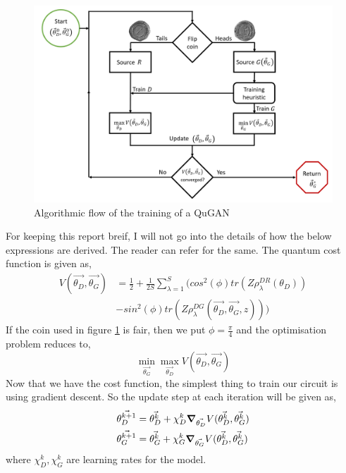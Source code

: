 \documentclass[conference]{IEEEtran}
\begin{document}
\begin{figure}[htbp]
\centerline{\includegraphics[scale = 0.2]{Images/q-train.png}}
\caption{Algorithmic flow of the training of a QuGAN}
\label{q-train}
\end{figure}

For keeping this report breif, I will not go into the details of how the below expressions are derived. The reader can refer \cite{b7} for the same. 
The quantum cost function is given as, 
\begin{align*}
    V(\vec{\theta_D}, \vec{\theta_G}) &= \frac{1}{2} + \frac{1}{2S} \sum_{\lambda=1}^{S}(cos^2(\phi)tr(Z\rho_{\lambda}^{DR}(\theta_D)) \\ 
    & -sin^2(\phi) tr(Z\rho_{\lambda}^{DG}(\vec{\theta_D}, \vec{\theta_G}, z)))
\end{align*}
If the coin used in figure \ref{q-train} is fair, then we put $\phi = \frac{\pi}{4}$ and the optimisation problem reduces to, 
\begin{equation*}
    \min_{\vec{\theta_G}} \max_{\vec{\theta_D}} V(\vec{\theta_D}, \vec{\theta_G})
\end{equation*} 
Now that we have the cost function, the simplest thing to train our circuit is using gradient descent. So the update step at each iteration will be given as, 
\begin{align*}
    \vec{\theta_D^{k+1}} &= \vec{\theta_D^{k}} + \chi_{D}^k \grad_{\vec{\theta_D}} V(\vec{\theta_D^k}, \vec{\theta_G^k}) \\
    \vec{\theta_G^{k+1}} &= \vec{\theta_G^{k}} + \chi_{G}^k \grad_{\vec{\theta_G}} V(\vec{\theta_D^k}, \vec{\theta_G^k})
\end{align*}
where $\chi_D^k, \chi_G^k$ are learning rates for the model.
\end{document}
